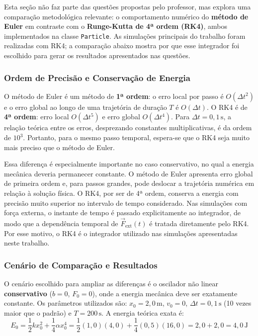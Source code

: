 Esta seção não faz parte das questões propostas pelo professor, mas explora uma comparação metodológica relevante: o comportamento numérico do \textbf{método de Euler} em contraste com o \textbf{Runge-Kutta de 4ª ordem (RK4)}, ambos implementados na classe \texttt{Particle}. As simulações principais do trabalho foram realizadas com RK4; a comparação abaixo mostra por que esse integrador foi escolhido para gerar os resultados apresentados nas questões.

\subsubsection{Ordem de Precisão e Conservação de Energia}

O método de Euler é um método de \textbf{1ª ordem}: o erro local por passo é $O(\Delta t^2)$ e o erro global ao longo de uma trajetória de duração $T$ é $O(\Delta t)$. O RK4 é de \textbf{4ª ordem}: erro local $O(\Delta t^5)$ e erro global $O(\Delta t^4)$. Para $\Delta t = 0{,}1\,\text{s}$, a relação teórica entre os erros, desprezando constantes multiplicativas, é da ordem de $10^3$. Portanto, para o mesmo passo temporal, espera-se que o RK4 seja muito mais preciso que o método de Euler.

Essa diferença é especialmente importante no caso conservativo, no qual a energia mecânica deveria permanecer constante. O método de Euler apresenta erro global de primeira ordem e, para passos grandes, pode deslocar a trajetória numérica em relação à solução física. O RK4, por ser de 4ª ordem, conserva a energia com precisão muito superior no intervalo de tempo considerado. Nas simulações com força externa, o instante de tempo é passado explicitamente ao integrador, de modo que a dependência temporal de $\vec{F}_\text{ext}(t)$ é tratada diretamente pelo RK4. Por esse motivo, o RK4 é o integrador utilizado nas simulações apresentadas neste trabalho.

\subsubsection{Cenário de Comparação e Resultados}

O cenário escolhido para ampliar as diferenças é o oscilador não linear \textbf{conservativo} ($b = 0$, $F_0 = 0$), onde a energia mecânica deve ser exatamente constante. Os parâmetros utilizados são: $x_0 = 2{,}0\,\text{m}$, $v_0 = 0$, $\Delta t = 0{,}1\,\text{s}$ (10 vezes maior que o padrão) e $T = 200\,\text{s}$. A energia teórica exata é:
\begin{equation}
    E_0 = \frac{1}{2}k x_0^2 + \frac{1}{4}\alpha x_0^4
        = \frac{1}{2}(1{,}0)(4{,}0) + \frac{1}{4}(0{,}5)(16{,}0)
        = 2{,}0 + 2{,}0 = 4{,}0\,\text{J}
\end{equation}


